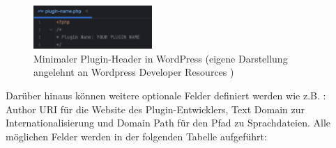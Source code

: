 \begin{figure}[H]
    \centering
    \includegraphics[width=0.4\textwidth]{images/wp_plugin_min}
    \caption{Minimaler Plugin-Header in WordPress (eigene Darstellung angelehnt an Wordpress Developer Resources \cite{wordpress2024HeaderRequirement})}
    \label{fig:wp-plugin-min}
\end{figure}

Darüber hinaus können weitere optionale Felder definiert werden wie z.B. :
Author URI für die Website des Plugin-Entwicklers, Text Domain
zur Internationalisierung und Domain Path für den Pfad zu Sprachdateien.
Alle möglichen Felder werden in der folgenden Tabelle aufgeführt:
\renewcommand{\arraystretch}{1.3}

